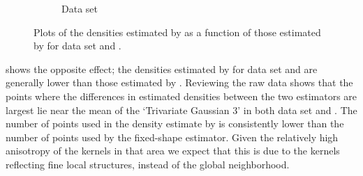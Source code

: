 \begin{figure}
\begin{subfigure}{0.3\textwidth}
				\caption{Data set \baakmanTwo}
				\label{fig:discussion:performance:mbevssambe:baakman2}
			\end{subfigure}	
			\caption{Plots of the densities estimated by \sambe as a function of those estimated by \mbe for data set %
				\ferdosiTwo and %
				\baakmanTwo.
			}
			\label{fig:discussion:performance:two:mbevssambe}
		\end{figure}
		
		 shows the opposite effect; the densities estimated by \sambe for data set \ferdosiThree and \baakmanThree are generally lower than those estimated by \mbe. Reviewing the raw data shows that the points where the differences in estimated densities between the two estimators are largest lie near the mean of the `Trivariate Gaussian 3' in both data set \ferdosiThree and \baakmanThree. The number of points used in the density estimate by \sambe is consistently lower than the number of points used by the fixed-shape estimator. Given the relatively high anisotropy of the kernels in that area we expect that this is due to the kernels reflecting fine local structures, instead of the global neighborhood. 
